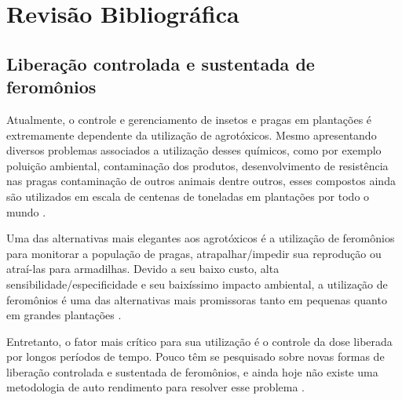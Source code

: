 
\chapter{Revisão Bibliográfica}

\section{Liberação controlada e sustentada de feromônios}

Atualmente, o controle e gerenciamento de insetos e pragas em plantações é extremamente dependente da utilização de agrotóxicos. Mesmo apresentando diversos problemas associados a utilização desses químicos, como por exemplo poluição ambiental, contaminação dos produtos, desenvolvimento de resistência nas pragas contaminação de outros animais dentre outros, esses compostos ainda são utilizados em escala de centenas de toneladas em plantações por todo o mundo \cite{rigotto2014pesticide} \cite{lewis2015pesticide}.

Uma das alternativas mais elegantes aos agrotóxicos é a utilização de feromônios para monitorar a população de pragas, atrapalhar/impedir sua reprodução ou atraí-las para armadilhas. Devido a seu baixo custo, alta sensibilidade/especificidade e seu baixíssimo impacto ambiental, a utilização de feromônios é uma das alternativas mais promissoras tanto em pequenas quanto em grandes plantações \cite{howse2013insect} \cite{witzgall2010sex}. 

Entretanto, o fator mais crítico para sua utilização é o controle da dose liberada por longos períodos de tempo. Pouco têm se pesquisado sobre novas formas de liberação controlada e sustentada de feromônios, e ainda hoje não existe uma metodologia de auto rendimento para resolver esse problema \cite{el2006potential}.


